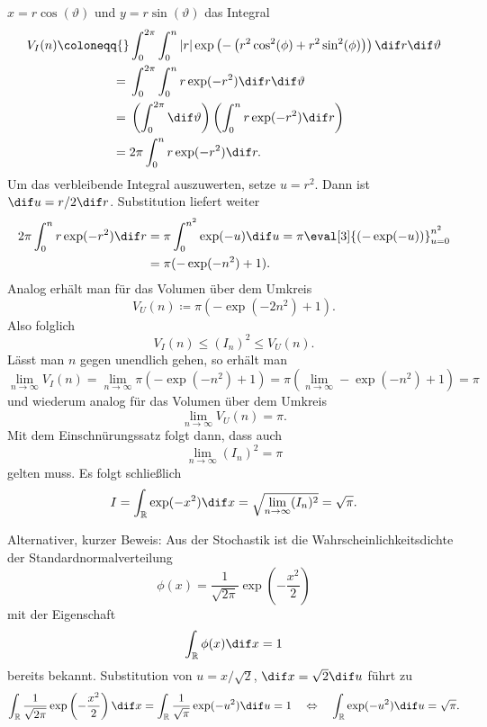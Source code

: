 \documentclass{scrartcl}
\newcommand{\R}{\mathbb{R}}
\begin{document}
$ x = r \cos(\vartheta) $ und
$ y = r \sin(\vartheta) $ das Integral
\begin{align*}
V_{I}(n) \coloneqq{}& \int_{0}^{2\pi} \int_{0}^{n} |r|
      \exp\left(- \left( r^{2} \cos^{2}(\phi) + r^{2} \sin^{2}(\phi) \right) \right) 
      \dif r \dif \vartheta \\
={}& \int_{0}^{2\pi} \int_{0}^{n} r \exp(- r^{2} ) \dif r \dif \vartheta \\
={}& \left( \int_{0}^{2\pi} \dif \vartheta \right) 
            \left( \int_{0}^{n} r \exp(- r^{2} ) \dif r \right) \\
={}& 2\pi \int_{0}^{n} r \exp(- r^{2} ) \dif r .
\end{align*}
Um das verbleibende Integral auszuwerten, setze $ u = r^{2} $. Dann ist $ \dif u = r / 2 \dif r $. 
Substitution liefert weiter
\begin{align*}
   2\pi \int_{0}^{n} r \exp(- r^{2} ) \dif r
&= \pi \int_{0}^{n^{2}} \exp(- u ) \dif u
 = \pi \eval[3]{\left( -\exp(-u) \right)}_{u = 0}^{n^{2}} \\
&= \pi (-\exp(-n^{2}) + 1).
\end{align*}
Analog erhält man für das Volumen über dem Umkreis
\[
  V_{U}(n) \coloneqq \pi (-\exp(-2n^{2}) + 1).
\]
Also folglich
\[
  V_{I}(n) \leq (I_{n})^{2} \leq V_{U}(n).
\]
Lässt man $ n $ gegen unendlich gehen, so erhält man
\[
  \lim\limits_{n \to \infty} V_{I}(n)
 = \lim\limits_{n \to \infty} \pi (-\exp(-n^{2}) + 1)
 = \pi \left( \lim\limits_{n \to \infty} -\exp(-n^{2}) + 1 \right)
 = \pi
\]
und wiederum analog für das Volumen über dem Umkreis
\[
  \lim\limits_{n \to \infty} V_{U}(n) = \pi.
\]
Mit dem Einschnürungssatz folgt dann, dass auch
\[
  \lim\limits_{n \to \infty} (I_{n})^{2} = \pi
\]
gelten muss. Es folgt schließlich
\[
  I = \int_{\R} \exp(-x^{2}) \dif x = \sqrt{ \lim\limits_{n \to \infty} (I_{n})^{2} } = \sqrt{\pi}.
\]

Alternativer, kurzer Beweis: Aus der Stochastik ist die Wahrscheinlichkeitsdichte der 
Standardnormalverteilung
\[
  \phi(x) = \frac{1}{\sqrt{2 \pi}} \exp \left( - \frac{x^{2}}{2} \right)
\]
mit der Eigenschaft
\[
  \int_{\R} \phi(x) \dif x = 1
\]
bereits bekannt. Substitution von $ u = x / \sqrt{2} $, $ \dif x = \sqrt{2} \dif u $ führt zu
\[
    \int_{\R} \frac{1}{\sqrt{2 \pi}} \exp \left( - \frac{x^{2}}{2} \right) \dif x
  = \int_{\R} \frac{1}{\sqrt{\pi}} \exp(-u^{2}) \dif u
  = 1 \quad \Leftrightarrow \quad
    \int_{\R} \exp(-u^{2}) \dif u = \sqrt{\pi}.
\]
\end{document}
